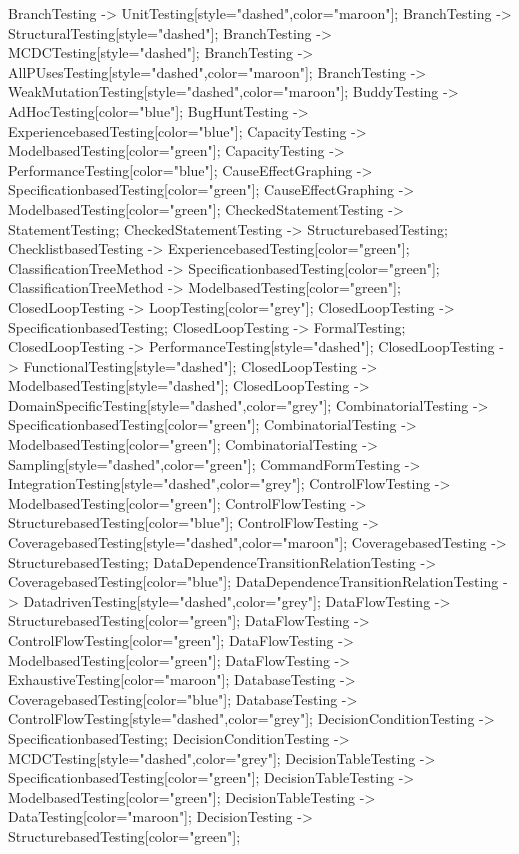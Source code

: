 \documentclass{article}
\begin{document}
{BranchTesting -> UnitTesting[style="dashed",color="maroon"];
BranchTesting -> StructuralTesting[style="dashed"];
BranchTesting -> MCDCTesting[style="dashed"];
BranchTesting -> AllPUsesTesting[style="dashed",color="maroon"];
BranchTesting -> WeakMutationTesting[style="dashed",color="maroon"];
BuddyTesting -> AdHocTesting[color="blue"];
BugHuntTesting -> ExperiencebasedTesting[color="blue"];
CapacityTesting -> ModelbasedTesting[color="green"];
CapacityTesting -> PerformanceTesting[color="blue"];
CauseEffectGraphing -> SpecificationbasedTesting[color="green"];
CauseEffectGraphing -> ModelbasedTesting[color="green"];
CheckedStatementTesting -> StatementTesting;
CheckedStatementTesting -> StructurebasedTesting;
ChecklistbasedTesting -> ExperiencebasedTesting[color="green"];
ClassificationTreeMethod -> SpecificationbasedTesting[color="green"];
ClassificationTreeMethod -> ModelbasedTesting[color="green"];
ClosedLoopTesting -> LoopTesting[color="grey"];
ClosedLoopTesting -> SpecificationbasedTesting;
ClosedLoopTesting -> FormalTesting;
ClosedLoopTesting -> PerformanceTesting[style="dashed"];
ClosedLoopTesting -> FunctionalTesting[style="dashed"];
ClosedLoopTesting -> ModelbasedTesting[style="dashed"];
ClosedLoopTesting -> DomainSpecificTesting[style="dashed",color="grey"];
CombinatorialTesting -> SpecificationbasedTesting[color="green"];
CombinatorialTesting -> ModelbasedTesting[color="green"];
CombinatorialTesting -> Sampling[style="dashed",color="green"];
CommandFormTesting -> IntegrationTesting[style="dashed",color="grey"];
ControlFlowTesting -> ModelbasedTesting[color="green"];
ControlFlowTesting -> StructurebasedTesting[color="blue"];
ControlFlowTesting -> CoveragebasedTesting[style="dashed",color="maroon"];
CoveragebasedTesting -> StructurebasedTesting;
DataDependenceTransitionRelationTesting -> CoveragebasedTesting[color="blue"];
DataDependenceTransitionRelationTesting -> DatadrivenTesting[style="dashed",color="grey"];
DataFlowTesting -> StructurebasedTesting[color="green"];
DataFlowTesting -> ControlFlowTesting[color="green"];
DataFlowTesting -> ModelbasedTesting[color="green"];
DataFlowTesting -> ExhaustiveTesting[color="maroon"];
DatabaseTesting -> CoveragebasedTesting[color="blue"];
DatabaseTesting -> ControlFlowTesting[style="dashed",color="grey"];
DecisionConditionTesting -> SpecificationbasedTesting;
DecisionConditionTesting -> MCDCTesting[style="dashed",color="grey"];
DecisionTableTesting -> SpecificationbasedTesting[color="green"];
DecisionTableTesting -> ModelbasedTesting[color="green"];
DecisionTableTesting -> DataTesting[color="maroon"];
DecisionTesting -> StructurebasedTesting[color="green"];
}
\end{document}
